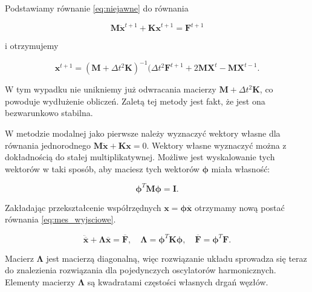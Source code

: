 Podstawiamy równanie \ref{eq:niejawne} do równania

\begin{equation} \label{eq:mes_wyjsciowe}
	\textbf{M} \ddot{\textbf{x}}^{t+1} + \textbf{Kx}^{t+1} = \textbf{F}^{t+1}
\end{equation}

i otrzymujemy 

\begin{equation} 
	\textbf{x}^{t+1} = (\textbf{M} + \Delta t^2 \textbf{K})^{-1} (\Delta t^2 \textbf{F}^{t+1} + 2\textbf{MX}^t - \textbf{MX}^{t-1}.
\end{equation}

W tym wypadku nie unikniemy już odwracania macierzy \( \textbf{M} + \Delta t^2 \textbf{K} \), co powoduje wydłużenie obliczeń. Zaletą tej metody jest fakt, że jest ona bezwarunkowo stabilna.

W metodzie modalnej jako pierwsze należy wyznaczyć wektory własne dla równania jednorodnego \( \textbf{M} \ddot{\textbf{x}} + \textbf{Kx} = 0 \). Wektory własne wyznaczyć można z dokładnością do stałej multiplikatywnej. Możliwe jest wyskalowanie tych wektorów w taki sposób, aby maciesz tych wektorów \( \boldsymbol{\phi} \) miała własność:

\begin{equation} 
	\boldsymbol{\phi}^T \textbf{M} \boldsymbol{\phi} = \textbf{I}.
\end{equation}

Zakładając przekształcenie współrzędnych \( \textbf{x} = \boldsymbol{\phi} \overbar{\textbf{x}}  \) otrzymamy nową postać równania \ref{eq:mes_wyjsciowe}.

\begin{equation} 
	\ddot{\overbar{\textbf{x}}} + \boldsymbol{\Lambda} \overbar{\textbf{x}} = \overbar{\textbf{F}}, \quad \boldsymbol{\Lambda} = \boldsymbol{\phi}^T\textbf{K}\boldsymbol{\phi}, \quad \overbar{\textbf{F}} = \boldsymbol{\phi}^T \textbf{F}.
\end{equation}

Macierz \( \boldsymbol{\Lambda} \) jest macierzą diagonalną, więc rozwiązanie układu sprowadza się teraz do znalezienia rozwiązania dla pojedynczych oscylatorów harmonicznych. Elementy macierzy \( \boldsymbol{\Lambda} \) są kwadratami częstości własnych drgań węzłów.

